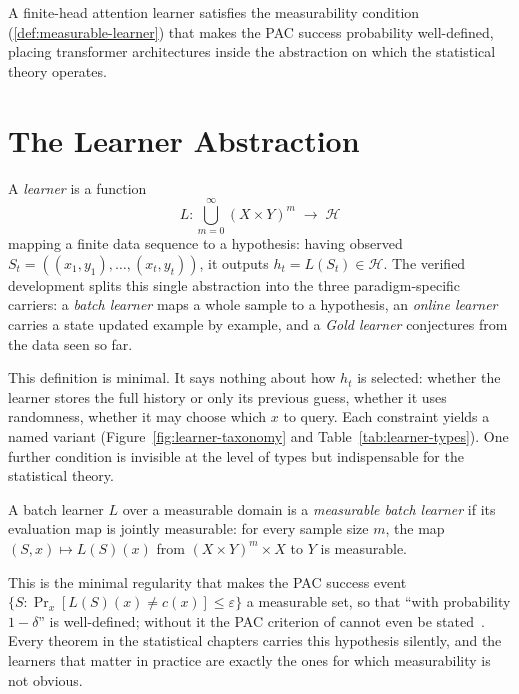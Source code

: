 A finite-head attention learner satisfies the measurability condition (\cref{def:measurable-learner}) that makes the PAC success probability well-defined, placing transformer architectures inside the abstraction on which the statistical theory operates.


\section{The Learner Abstraction}
\label{sec:learner}

\begin{defn}[Learner]
\label{def:learner}
A \emph{learner} is a function
\[
L \colon \bigcup_{m=0}^{\infty} (X \times Y)^m \;\to\; \mathcal{H}
\]
mapping a finite data sequence to a hypothesis: having observed $S_t = ((x_1, y_1), \ldots, (x_t, y_t))$, it outputs $h_t = L(S_t) \in \mathcal{H}$. The verified development splits this single abstraction into the three paradigm-specific carriers: a \emph{batch learner} maps a whole sample to a hypothesis, an \emph{online learner} carries a state updated example by example, and a \emph{Gold learner} conjectures from the data seen so far.
\end{defn}

This definition is minimal. It says nothing about how $h_t$ is selected: whether the learner stores the full history or only its previous guess, whether it uses randomness, whether it may choose which $x$ to query. Each constraint yields a named variant (Figure~\ref{fig:learner-taxonomy} and Table~\ref{tab:learner-types}). One further condition is invisible at the level of types but indispensable for the statistical theory.

\begin{defn}
\label{def:measurable-learner}
A batch learner $L$ over a measurable domain is a \emph{measurable batch learner} if its evaluation map is jointly measurable: for every sample size $m$, the map $(S, x) \mapsto L(S)(x)$ from $(X \times Y)^m \times X$ to $Y$ is measurable.
\end{defn}

This is the minimal regularity that makes the PAC success event $\{S : \Pr_x[L(S)(x) \neq c(x)] \leq \varepsilon\}$ a measurable set, so that ``with probability $1 - \delta$'' is well-defined; without it the PAC criterion of  cannot even be stated~\cite{KrappWirth2024}. Every theorem in the statistical chapters carries this hypothesis silently, and the learners that matter in practice are exactly the ones for which measurability is not obvious.

